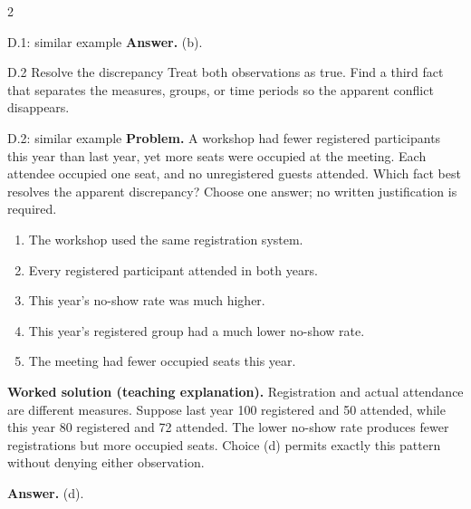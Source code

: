 \documentclass[10pt]{extarticle}
\begin{document}
\begin{multicols}{2}
\begin{workedbox}{D.1: similar example}
\textbf{Answer.} (b).
\end{workedbox}

\begin{methodbox}{D.2 Resolve the discrepancy}
Treat both observations as true. Find a third fact that separates the measures,
groups, or time periods so the apparent conflict disappears.
\end{methodbox}
\begin{workedbox}{D.2: similar example}
\textbf{Problem.} A workshop had fewer registered participants this year than last year, yet more seats were occupied at the meeting. Each attendee occupied one seat, and no unregistered guests attended. Which fact best resolves the apparent discrepancy? Choose one answer; no written justification is required.

\begin{enumerate}[label=(\alph*)]
\item The workshop used the same registration system.
\item Every registered participant attended in both years.
\item This year's no-show rate was much higher.
\item This year's registered group had a much lower no-show rate.
\item The meeting had fewer occupied seats this year.
\end{enumerate}
\textbf{Worked solution (teaching explanation).} Registration and actual attendance are different measures. Suppose last year 100 registered and 50 attended, while this year 80 registered and 72 attended. The lower no-show rate produces fewer registrations but more occupied seats. Choice (d) permits exactly this pattern without denying either observation.

\textbf{Answer.} (d).
\end{workedbox}


\end{multicols}
\end{document}
